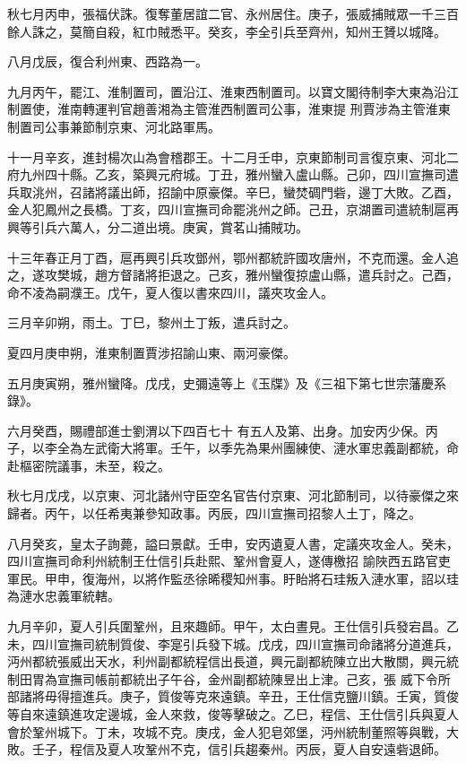 \begin{pinyinscope}
 秋七月丙申，張福伏誅。復奪董居誼二官、永州居住。庚子，張威捕賊眾一千三百餘人誅之，莫簡自殺，紅巾賊悉平。癸亥，李全引兵至齊州，知州王贇以城降。



 八月戊辰，復合利州東、西路為一。



 九月丙午，罷江、淮制置司，置沿江、淮東西制置司。以寶文閣待制李大東為沿江制置使，淮南轉運判官趙善湘為主管淮西制置司公事，淮東提
 刑賈涉為主管淮東制置司公事兼節制京東、河北路軍馬。



 十一月辛亥，進封楊次山為會稽郡王。十二月壬申，京東節制司言復京東、河北二府九州四十縣。乙亥，築興元府城。丁丑，雅州蠻入盧山縣。己卯，四川宣撫司遣兵取洮州，召諸將議出師，招諭中原豪傑。辛巳，蠻焚碉門砦，邊丁大敗。乙酉，金人犯鳳州之長橋。丁亥，四川宣撫司命罷洮州之師。己丑，京湖置司遣統制扈再興等引兵六萬人，分二道出境。庚寅，賞茗山捕賊功。



 十三年春正月丁酉，扈再興引兵攻鄧州，鄂州都統許國攻唐州，不克而還。金人追之，遂攻樊城，趙方督諸將拒退之。己亥，雅州蠻復掠盧山縣，遣兵討之。己酉，命不凌為嗣濮王。戊午，夏人復以書來四川，議夾攻金人。



 三月辛卯朔，雨土。丁巳，黎州土丁叛，遣兵討之。



 夏四月庚申朔，淮東制置賈涉招諭山東、兩河豪傑。



 五月庚寅朔，雅州蠻降。戊戌，史彌遠等上《玉牒》及《三祖下第七世宗藩慶系錄》。



 六月癸酉，賜禮部進士劉渭以下四百七十
 有五人及第、出身。加安丙少保。丙子，以李全為左武衛大將軍。壬午，以季先為果州團練使、漣水軍忠義副都統，命赴樞密院議事，未至，殺之。



 秋七月戊戌，以京東、河北諸州守臣空名官告付京東、河北節制司，以待豪傑之來歸者。丙午，以任希夷兼參知政事。丙辰，四川宣撫司招黎人土丁，降之。



 八月癸亥，皇太子詢薨，謚曰景獻。壬申，安丙遺夏人書，定議夾攻金人。癸未，四川宣撫司命利州統制王仕信引兵赴熙、鞏州會夏人，遂傳檄招
 諭陜西五路官吏軍民。甲申，復海州，以將作監丞徐晞稷知州事。盱眙將石珪叛入漣水軍，詔以珪為漣水忠義軍統轄。



 九月辛卯，夏人引兵圍鞏州，且來趣師。甲午，太白晝見。王仕信引兵發宕昌。乙未，四川宣撫司統制質俊、李寔引兵發下城。戊戌，四川宣撫司命諸將分道進兵，沔州都統張威出天水，利州副都統程信出長道，興元副都統陳立出大散關，興元統制田胃為宣撫司帳前都統出子午谷，金州副都統陳昱出上津。己亥，張
 威下令所部諸將毋得擅進兵。庚子，質俊等克來遠鎮。辛丑，王仕信克鹽川鎮。壬寅，質俊等自來遠鎮進攻定邊城，金人來救，俊等擊破之。乙巳，程信、王仕信引兵與夏人會於鞏州城下。丁未，攻城不克。庚戌，金人犯皂郊堡，沔州統制董照等與戰，大敗。壬子，程信及夏人攻鞏州不克，信引兵趨秦州。丙辰，夏人自安遠砦退師。




\end{pinyinscope}
